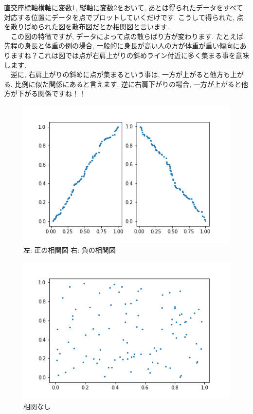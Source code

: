 \documentclass[11pt,a4paper]{jreport}
\begin{document}
直交座標軸横軸に変数1, 縦軸に変数2をおいて, あとは得られたデータをすべて対応する位置にデータを点でプロットしていくだけです. こうして得られた, 点を散りばめられた図を散布図だとか相関図と言います.\\
　この図の特徴ですが, データによって点の散らばり方が変わります. たとえば先程の身長と体重の例の場合, 一般的に身長が高い人の方が体重が重い傾向にありますね？これは図では点が右肩上がりの斜めライン付近に多く集まる事を意味します. \\
　逆に, 右肩上がりの斜めに点が集まるという事は, 一方が上がると他方も上がる, 比例に似た関係にあると言えます. 逆に右肩下がりの場合, 一方が上がると他方が下がる関係ですね！！\\

\begin{figure}[H]
\label{im:scatter1}
  \centering
  \includegraphics[width=120mm,bb=0 0 432 288]{../figures/scatter1.png}
  \caption{左: 正の相関図 右: 負の相関図}
\end{figure}

\begin{figure}[H]
\label{im:scatter2}
  \centering
  \includegraphics[width=120mm,bb=0 0 432 288]{../figures/scatter2.png}
  \caption{相関なし}
\end{figure}
\end{document}
